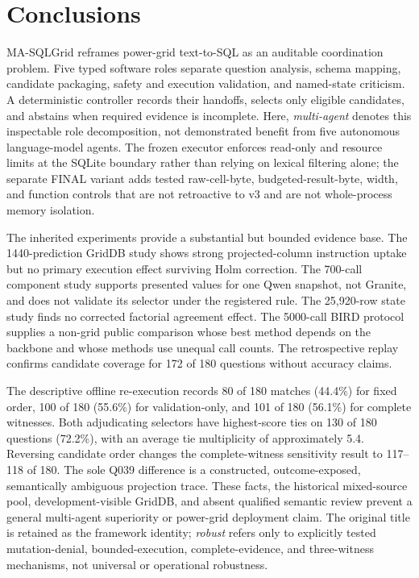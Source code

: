 \documentclass[applsci,article,submit,moreauthors]{Definitions/mdpi}
\newcommand{\masql}{MA-SQLGrid}
\begin{document}
\section{Conclusions}

\masql{} reframes power-grid text-to-SQL as an auditable coordination problem. Five typed software roles separate question analysis, schema mapping, candidate packaging, safety and execution validation, and named-state criticism. A deterministic controller records their handoffs, selects only eligible candidates, and abstains when required evidence is incomplete. Here, \emph{multi-agent} denotes this inspectable role decomposition, not demonstrated benefit from five autonomous language-model agents. The frozen executor enforces read-only and resource limits at the SQLite boundary rather than relying on lexical filtering alone; the separate FINAL variant adds tested raw-cell-byte, budgeted-result-byte, width, and function controls that are not retroactive to v3 and are not whole-process memory isolation.

The inherited experiments provide a substantial but bounded evidence base. The 1440-prediction GridDB study shows strong projected-column instruction uptake but no primary execution effect surviving Holm correction. The 700-call component study supports presented values for one Qwen snapshot, not Granite, and does not validate its selector under the registered rule. The 25,920-row state study finds no corrected factorial agreement effect. The 5000-call BIRD protocol supplies a non-grid public comparison whose best method depends on the backbone and whose methods use unequal call counts. The retrospective replay confirms candidate coverage for 172 of 180 questions without accuracy claims.

The descriptive offline re-execution records 80 of 180 matches (44.4\%) for fixed order, 100 of 180 (55.6\%) for validation-only, and 101 of 180 (56.1\%) for complete witnesses. Both adjudicating selectors have highest-score ties on 130 of 180 questions (72.2\%), with an average tie multiplicity of approximately 5.4. Reversing candidate order changes the complete-witness sensitivity result to 117--118 of 180. The sole Q039 difference is a constructed, outcome-exposed, semantically ambiguous projection trace. These facts, the historical mixed-source pool, development-visible GridDB, and absent qualified semantic review prevent a general multi-agent superiority or power-grid deployment claim. The original title is retained as the framework identity; \emph{robust} refers only to explicitly tested mutation-denial, bounded-execution, complete-evidence, and three-witness mechanisms, not universal or operational robustness.
\end{document}
